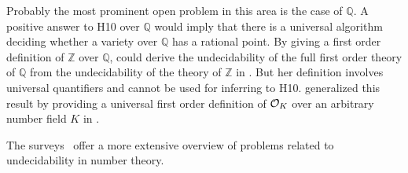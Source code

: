 Probably the most prominent open problem in this area is the case of \(ℚ\). A
positive answer to \textsc{H10} over \(ℚ\) would imply that there is a universal
algorithm deciding whether a variety over \(ℚ\) has a rational point. By giving
a first order definition of \(ℤ\) over \(ℚ\), \textcite{Robinson1949} could
derive the undecidability of the full first order theory of \(ℚ\) from the
undecidability of the theory of \(ℤ\) in \citeyear{Robinson1949}. But her
definition involves universal quantifiers and cannot be used for inferring to
\textsc{H10}. \Textcite{Park2013} generalized this result by providing a
universal first order definition of \(\mathcal{O}_{K}\) over an arbitrary number field
\(K\) in \citeyear{Park2013}.

The surveys~\cite{Koenigsmann2014,Poonen2008} offer a more extensive overview of
problems related to undecidability in number theory.
